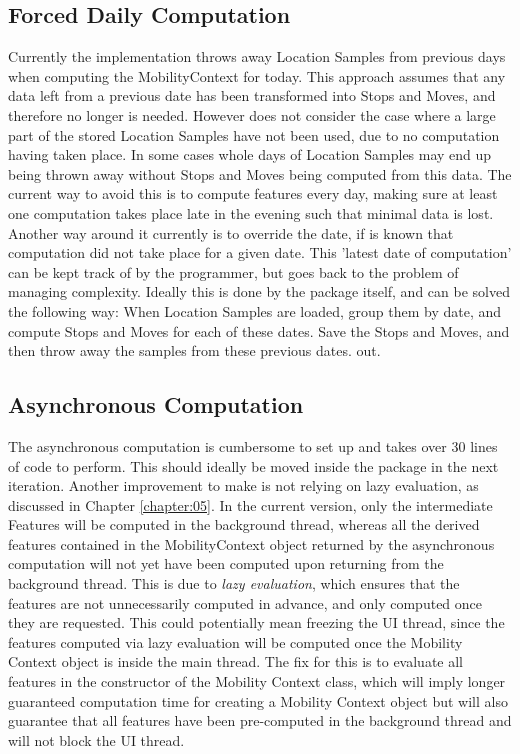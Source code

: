 \subsection{Forced Daily Computation}
Currently the implementation throws away Location Samples from previous days when computing the MobilityContext for today. This approach assumes that any data left from a previous date has been transformed into Stops and Moves, and therefore no longer is needed. However does not consider the case where a large part of the stored Location Samples have not been used, due to no computation having taken place. In some cases whole days of Location Samples may end up being thrown away without Stops and Moves being computed from this data. The current way to avoid this is to compute features every day, making sure at least one computation takes place late in the evening such that minimal data is lost. Another way around it currently is to override the date, if is known that computation did not take place for a given date. This 'latest date of computation' can be kept track of by the programmer, but goes back to the problem of managing complexity. Ideally this is done by the package itself, and can be solved the following way:
When Location Samples are loaded, group them by date, and compute Stops and Moves for each of these dates. Save the Stops and Moves, and then throw away the samples from these previous dates. out.

\subsection{Asynchronous Computation}
The asynchronous computation is cumbersome to set up and takes over 30 lines of code to perform. This should ideally be moved inside the package in the next iteration. Another improvement to make is not relying on lazy evaluation, as discussed in Chapter \ref{chapter:05}. In the current version, only the intermediate Features will be computed in the background thread, whereas all the derived features contained in the MobilityContext object returned by the asynchronous computation will not yet have been computed upon returning from the background thread. This is due to \textit{lazy evaluation}, which ensures that the features are not unnecessarily computed in advance, and only computed once they are requested. This could potentially mean freezing the UI thread, since the features computed via lazy evaluation will be computed once the Mobility Context object is inside the main thread. The fix for this is to evaluate all features in the constructor of the Mobility Context class, which will imply longer guaranteed computation time for creating a Mobility Context object but will also guarantee that all features have been pre-computed in the background thread and will not block the UI thread. 

